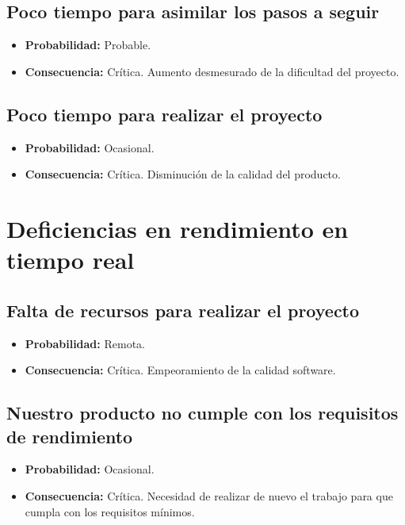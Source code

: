 \documentclass[spanish,a4paper,12pt]{report}	%
\begin{document}
	\subsection*{Poco tiempo para asimilar los pasos a seguir}	
		\begin{itemize}
			\item \textbf {Probabilidad: }Probable.
			\item \textbf {Consecuencia: }Crítica. Aumento desmesurado de la dificultad del proyecto.
		\end{itemize}
	
	\subsection*{Poco tiempo para realizar el proyecto}	
		\begin{itemize}
			\item \textbf {Probabilidad: }Ocasional.
			\item \textbf {Consecuencia: }Crítica. Disminución de la calidad del producto.
		\end{itemize}

%
\section{Deficiencias en rendimiento en tiempo real}

	\subsection*{Falta de recursos para realizar el proyecto}	
		\begin{itemize}
			\item \textbf {Probabilidad: }Remota.
			\item \textbf {Consecuencia: }Crítica. Empeoramiento de la calidad software.
		\end{itemize}
	
	\subsection*{Nuestro producto no cumple con los requisitos de rendimiento}	
		\begin{itemize}
			\item \textbf {Probabilidad: }Ocasional.
			\item \textbf {Consecuencia: }Crítica. Necesidad de realizar de nuevo el trabajo para que cumpla con los requisitos mínimos.
		\end{itemize}
	
\end{document}
